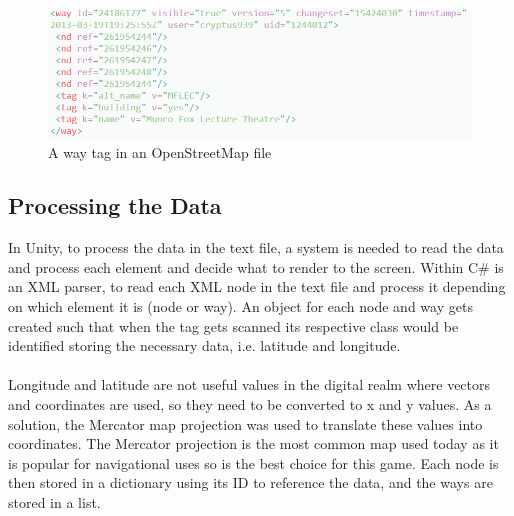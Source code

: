 \documentclass[a4paper]{report}
\begin{document}
\begin{figure}[h]
\centering
\includegraphics[scale=0.7]{way}
\caption{A way tag in an OpenStreetMap file}
\end{figure}
\pagebreak
\subsection{Processing the Data}
In Unity, to process the data in the text file, a system is needed to read the data and process each element and decide what to render to the screen. Within C\# is an XML parser, to read each XML node in the text file and process it depending on which element it is (node or way). An object for each node and way gets created such that when the tag gets scanned its respective class would be identified storing the necessary data, i.e. latitude and longitude. 
\\\\
Longitude and latitude are not useful values in the digital realm where vectors and coordinates are used, so they need to be converted to x and y values. As a solution, the Mercator map projection was used to translate these values into coordinates. The Mercator projection is the most common map used today as it is popular for navigational uses so is the best choice for this game. Each node is then stored in a dictionary using its ID to reference the data, and the ways are stored in a list. 
\end{document}
